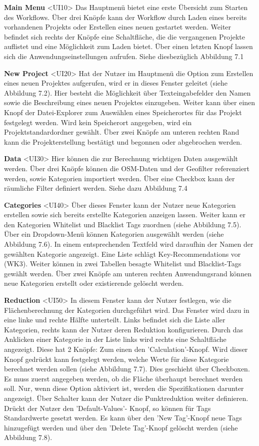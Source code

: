 \documentclass[parskip=full]{scrartcl} %
\begin{document}
\textbf{Main Menu }<UI10>
Das Hauptmenü bietet eine erste Übersicht zum Starten des Workflows. Über drei Knöpfe kann der Workflow durch Laden eines bereits vorhandenen Projekts oder Erstellen eines neuen gestartet werden. Weiter befindet sich rechts der Knöpfe eine Schaltfläche, die die vergangenen Projekte auflistet und eine Möglichkeit zum Laden bietet. Über einen letzten Knopf lassen sich die Anwendungseinstellungen aufrufen. Siehe diesbezüglich Abbildung 7.1

\textbf{New Project }<UI20>
Hat der Nutzer im Hauptmenü die Option zum Erstellen eines neuen Projektes aufgerufen, wird er in dieses Fenster geleitet (siehe Abbildung 7.2).
Hier besteht die Möglichkeit über Texteingabefelder den Namen sowie die Beschreibung eines neuen Projektes einzugeben. Weiter kann über einen Knopf der Datei-Explorer zum Auswählen eines Speicherortes für das Projekt festgelegt werden. Wird kein Speicherort angegeben, wird ein Projektstandardordner gewählt.
Über zwei Knöpfe am unteren rechten Rand kann die Projekterstellung bestätigt und begonnen oder abgebrochen werden.

\textbf{Data }<UI30>
Hier können die zur Berechnung wichtigen Daten ausgewählt werden.
Über drei Knöpfe können die OSM-Daten und der Geofilter referenziert werden, sowie Kategorien importiert werden. Über eine Checkbox kann der räumliche Filter definiert werden. Siehe dazu Abbildung 7.4 

\newpage

\textbf{Categories }<UI40>
Über dieses Fenster kann der Nutzer neue Kategorien erstellen sowie sich bereits erstellte Kategorien anzeigen lassen. Weiter kann er den Kategorien Whitelist und Blacklist Tags zuordnen (siehe Abbildung 7.5).
Über ein Dropdown-Menü können Kategorien ausgewählt werden (siehe Abbildung 7.6). In einem entsprechenden Textfeld wird daraufhin der Namen der gewählten Kategorie angezeigt. Eine Liste schlägt Key-Recommendations vor (WK3). Weiter können in zwei Tabellen besagte Whitelist und Blacklist-Tags gewählt werden.
Über zwei Knöpfe am unteren rechten Anwendungsrand können neue Kategorien erstellt oder existierende gelöscht werden. 

\textbf{Reduction }<UI50>
In diesem Fenster kann der Nutzer festlegen, wie die Flächenberechnung der Kategorien durchgeführt wird. Das Fenster wird dazu in eine linke und rechte Hälfte unterteilt.
Links befindet sich die Liste aller Kategorien, rechts kann der Nutzer deren Reduktion konfigurieren.
Durch das Anklicken einer Kategorie in der Liste links wird rechts eine Schaltfläche angezeigt. Diese hat 2 Knöpfe: Zum einen den 'Calculation'-Knopf. Wird dieser Knopf gedrückt kann festgelegt werden, welche Werte für diese Kategorie berechnet werden sollen (siehe Abbildung 7.7). Dies geschieht über Checkboxen. Es muss zuerst angegeben werden, ob die Fläche überhaupt berechnet werden soll. Nur, wenn diese Option aktiviert ist, werden die Spezifikationen darunter angezeigt. Über Schalter kann der Nutzer die Punktreduktion weiter definieren.
Drückt der Nutzer den 'Default-Values'- Knopf, so können für Tags Standardwerte gesetzt werden. Es kann über den 'New Tag'-Knopf neue Tags hinzugefügt werden und über den 'Delete Tag'-Knopf gelöscht werden (siehe Abbildung 7.8).
\end{document}
